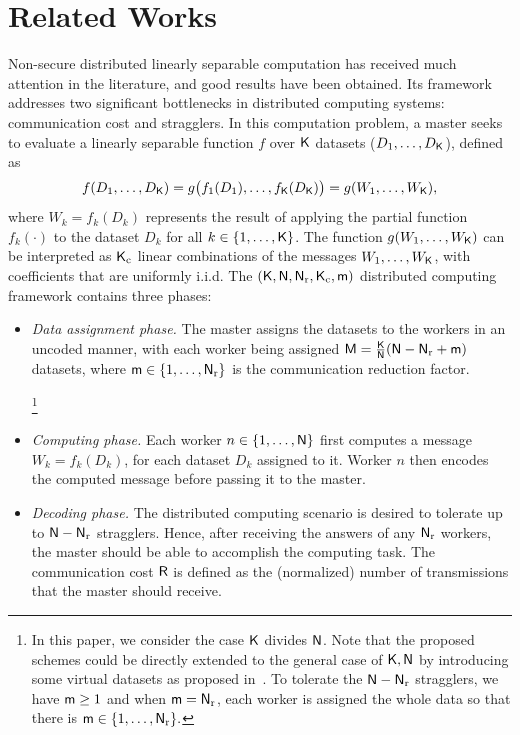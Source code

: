 \documentclass[conference,letterpaper]{IEEEtran}
\begin{document}
\iffalse

\section{Related Works}
Non-secure distributed linearly separable computation has received much attention in the literature, and good results have been obtained. Its framework addresses two significant bottlenecks in distributed computing systems: communication cost and stragglers. In this computation problem, a master seeks to evaluate a linearly separable function $f$ over ${\sf K}$ datasets ($D_1, \ldots, D_{{\sf K}}$), defined as 
$$
f(D_1, \ldots, D_{{\sf K}}) = g\big(f_1(D_1), \ldots, f_{{\sf K}}(D_{{\sf K}}) \big) = g(W_1, \ldots, W_{{\sf K}}),
$$
where $W_k = f_k(D_k)$ represents the result of applying the partial function $f_k(\cdot)$ to the dataset $D_k$ for all $k \in \{1, \ldots, {\sf K}\}$. The function $g(W_1, \ldots, W_{{\sf K}})$ can be interpreted as ${\sf K}_{\rm c}$ linear combinations of the messages $W_1, \ldots, W_{{\sf K}}$, with coefficients that are uniformly i.i.d.
The $({\sf K},{\sf N},{\sf N}_{\rm r},{\sf K}_{\rm c},{\sf m})$ distributed computing framework contains three phases:
  \begin{itemize}
  \item {\it Data assignment phase.} The master assigns the datasets to the workers in an uncoded manner, with each worker being assigned ${\sf M} = \frac{{\sf K}}{{\sf N}}({\sf N} - {\sf N}_{\rm r} + {\sf m})$ datasets, where ${\sf m} \in \{1, \ldots, {\sf N}_{\rm r}\}$ is the communication reduction factor.

  \footnote{\label{foot:K divides N}In this paper, we 
  consider the case  ${\sf K}$ divides ${\sf N}$. Note that the proposed schemes could be directly extended to the general case of ${\sf K}, {\sf N}$ by introducing some virtual datasets as proposed in~\cite{m=1}. To tolerate the ${\sf N} - {\sf N}_{\rm r}$ stragglers, we have ${\sf m} \ge 1$ and when ${\sf m} = {\sf N}_{\rm r}$, each worker is assigned the whole data so that there is ${\sf m} \in \{1,\ldots, {\sf N}_{\rm r}\}.$}

  \item {\it Computing phase.} Each worker  $n \in \{ 1,\ldots, {\sf N}\}$ first computes a message $W_{k}=f_{k}(D_{k})$, for each dataset $D_{k}$ assigned to it. 
   Worker $n$ then encodes the computed message before passing it to the master.
  
  \item {\it Decoding phase.} The distributed computing scenario is desired to 
  tolerate up to $ {\sf N}- {\sf N}_{\rm r}$ stragglers. Hence, after receiving the answers of any ${\sf N}_{\rm r}$ workers, the master should be able to accomplish the computing task. The communication cost ${\sf R}$ is defined as the (normalized) number of transmissions that the master should receive.
  \end{itemize}
\end{document}

